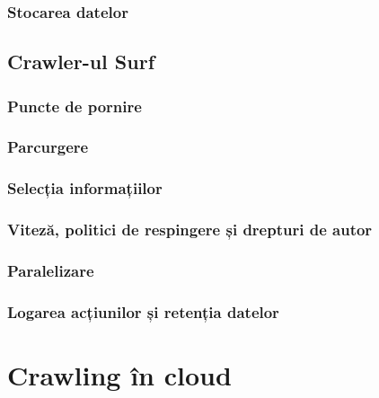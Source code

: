 \documentclass[12pt,oneside]{report}
\newcommand{\chaptertitle}[1]{\LARGE{#1}}
\begin{document}
\subsection{Stocarea datelor}

\clearpage

\section{Crawler-ul Surf}


\subsection{Puncte de pornire}


\subsection{Parcurgere}


\subsection{Selecția informațiilor}


\subsection{Viteză, politici de respingere și drepturi de autor}


\subsection{Paralelizare}


\subsection{Logarea acțiunilor și retenția datelor}

\clearpage

\setcounter{section}{0}
\chapter*{\chaptertitle{Crawling în cloud}}

\end{document}
